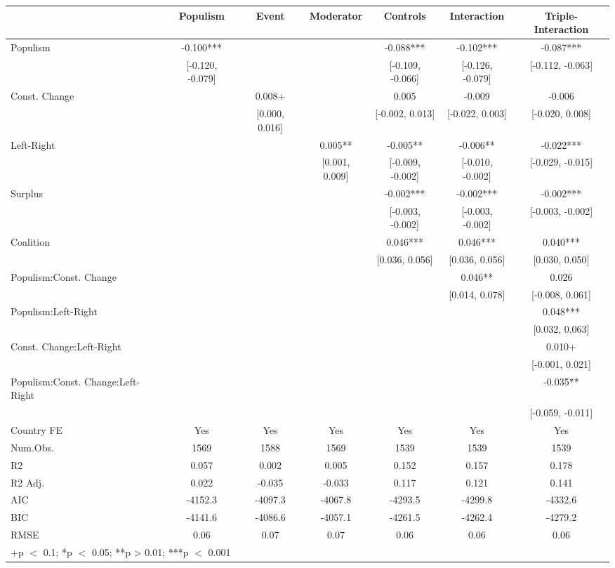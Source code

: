 \begin{table}
\centering\centering\centering
\begin{tabular}[t]{lcccccc}
\toprule
  & Populism & Event & Moderator & Controls & Interaction & Triple-Interaction\\
\midrule
Populism & -0.100*** &  &  & -0.088*** & -0.102*** & -0.087***\\
 & {}[-0.120, -0.079] &  &  & {}[-0.109, -0.066] & {}[-0.126, -0.079] & {}[-0.112, -0.063]\\
Const. Change &  & 0.008+ &  & 0.005 & -0.009 & -0.006\\
 &  & {}[0.000, 0.016] &  & {}[-0.002, 0.013] & {}[-0.022, 0.003] & {}[-0.020, 0.008]\\
Left-Right &  &  & 0.005** & -0.005** & -0.006** & -0.022***\\
 &  &  & {}[0.001, 0.009] & {}[-0.009, -0.002] & {}[-0.010, -0.002] & {}[-0.029, -0.015]\\
Surplus &  &  &  & -0.002*** & -0.002*** & -0.002***\\
 &  &  &  & {}[-0.003, -0.002] & {}[-0.003, -0.002] & {}[-0.003, -0.002]\\
Coalition &  &  &  & 0.046*** & 0.046*** & 0.040***\\
 &  &  &  & {}[0.036, 0.056] & {}[0.036, 0.056] & {}[0.030, 0.050]\\
Populism:Const. Change &  &  &  &  & 0.046** & 0.026\\
 &  &  &  &  & {}[0.014, 0.078] & {}[-0.008, 0.061]\\
Populism:Left-Right &  &  &  &  &  & 0.048***\\
 &  &  &  &  &  & {}[0.032, 0.063]\\
Const. Change:Left-Right &  &  &  &  &  & 0.010+\\
 &  &  &  &  &  & {}[-0.001, 0.021]\\
Populism:Const. Change:Left-Right &  &  &  &  &  & -0.035**\\
 &  &  &  &  &  & {}[-0.059, -0.011]\\
\midrule
Country FE & Yes & Yes & Yes & Yes & Yes & Yes\\
Num.Obs. & 1569 & 1588 & 1569 & 1539 & 1539 & 1539\\
R2 & 0.057 & 0.002 & 0.005 & 0.152 & 0.157 & 0.178\\
R2 Adj. & 0.022 & -0.035 & -0.033 & 0.117 & 0.121 & 0.141\\
AIC & -4152.3 & -4097.3 & -4067.8 & -4293.5 & -4299.8 & -4332.6\\
BIC & -4141.6 & -4086.6 & -4057.1 & -4261.5 & -4262.4 & -4279.2\\
RMSE & 0.06 & 0.07 & 0.07 & 0.06 & 0.06 & 0.06\\
\bottomrule
\multicolumn{7}{l}{\rule{0pt}{1em}+p $<$ 0.1; *p $<$ 0.05; **p > 0.01; ***p $<$ 0.001}\\
\end{tabular}
\end{table}
